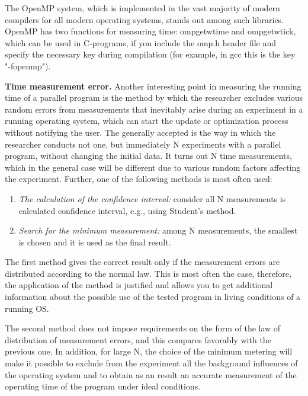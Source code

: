 {	\par The OpenMP system, which is implemented in the vast majority of modern compilers for all modern operating systems, stands out among such libraries. OpenMP has two functions for measuring time: omp\textunderscore get\textunderscore wtime and omp\textunderscore get\textunderscore wtick, which can be used in C-programs, if you include the omp.h header file and specify the necessary key during compilation (for example, in gcc this is the key "{}-fopenmp").
	\par\textbf{Time measurement error.} Another interesting point in measuring the running time of a parallel program is the method by which the researcher excludes various random errors from measurements that inevitably arise during an experiment in a running operating system, which can start the update or optimization process without notifying the user. The generally accepted is the way in which the researcher conducts not one, but immediately N experiments with a parallel program, without changing the initial data. It turns out N time measurements, which in the general case will be different due to various random factors affecting the experiment. Further, one of the following methods is most often used:
	\begin{enumerate}
		\item\textit{The calculation of the confidence interval:} consider all N measurements is calculated confidence interval, e.g., using Student's method.
		\item\textit{Search for the minimum measurement:} among N measurements, the smallest is chosen and it is used as the final result.
	\end{enumerate}
	\par The first method gives the correct result only if the measurement errors are distributed according to the normal law. This is most often the case, therefore, the application of the method is justified and allows you to get additional information about the possible use of the tested program in living conditions of a running OS.
	\par The second method does not impose requirements on the form of the law of distribution of measurement errors, and this compares favorably with the previous one. In addition, for large N, the choice of the minimum metering will make it possible to exclude from the experiment all the background influences of the operating system and to obtain as an result an accurate measurement of the operating time of the program under ideal conditions.
}

